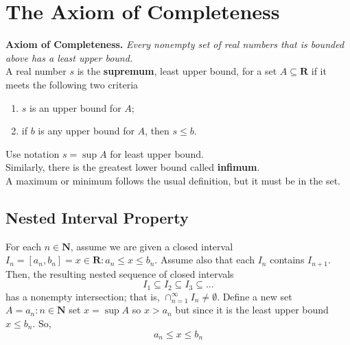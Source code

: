 \section{The Axiom of Completeness}
\textbf{Axiom of Completeness. }\textit{Every nonempty set of real numbers that is bounded above has a least upper bound.} \\
A real number $ s $ is the \textbf{supremum}, least upper bound, for a set $ A \subseteq \textbf{R} $ if it meets the following two criteria
\begin{enumerate}
	\item $ s $ is an upper bound for $ A $;
	\item if $ b $ is any upper bound for $ A $, then $ s \leq b $.
\end{enumerate}
Use notation $ s = \sup A $ for least upper bound. \\
Similarly, there is the greatest lower bound called \textbf{infimum}. \\
A maximum or minimum follows the usual definition, but it must be in the set.
\subsection{Nested Interval Property}
\begin{theorem}
	For each $ n \in \textbf{N} $, assume we are given a closed interval $ I_n = [a_n, b_n] = {x \in \textbf{R}: a_n \leq x \leq b_n}$. Assume also that each $ I_n $ contains $ I_{n+1} $. Then, the resulting nested sequence of closed intervals
	\[ I_1 \subseteq I_2 \subseteq I_3 \subseteq ... \]
	has a nonempty intersection; that is, $ \cap_{n =1}^\infty I_n \neq \emptyset$.
	Define a new set $ A = {a_n : n \in \textbf{N}} $ set $ x = \sup A $ so $ x > a_n $ but since it is the least upper bound $ x \leq b_n $. So, \[ a_n \leq x \leq b_n \]
\end{theorem}




 



